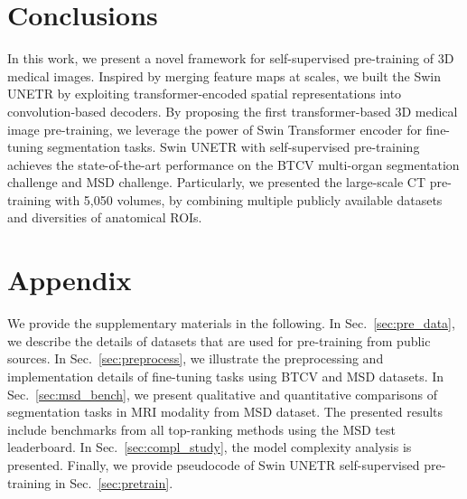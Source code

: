 \documentclass[10pt,twocolumn,letterpaper]{article}
\begin{document}
\section{Conclusions}
In this work, we present a novel framework for self-supervised pre-training of 3D medical images. Inspired by merging feature maps at scales, we built the Swin UNETR by exploiting transformer-encoded spatial representations into convolution-based decoders. By proposing the first transformer-based 3D medical image pre-training, we leverage the power of Swin Transformer encoder for fine-tuning segmentation tasks. Swin UNETR with self-supervised pre-training achieves the state-of-the-art performance on the BTCV multi-organ segmentation challenge and MSD challenge. Particularly, we presented the large-scale CT pre-training with 5,050 volumes, by combining multiple publicly available datasets and diversities of anatomical ROIs. 


{\small


}
\newpage
\section*{Appendix}
\appendix
\renewcommand{\thesection}{\Alph{section}}
\renewcommand\thefigure{S.\arabic{figure}}
\setcounter{figure}{0}
\renewcommand\thetable{S.\arabic{table}}
\setcounter{table}{0}
\renewcommand\thealgorithm{S.\arabic{algorithm}}
\setcounter{algorithm}{0}
We provide the supplementary materials in the following. In Sec.~\ref{sec:pre_data}, we describe the details of datasets that are used for pre-training from public sources. In Sec.~\ref{sec:preprocess}, we illustrate the preprocessing and implementation details of fine-tuning tasks using BTCV and MSD datasets. In Sec.~\ref{sec:msd_bench}, we present qualitative and quantitative comparisons of segmentation tasks in MRI modality from MSD dataset. The presented results include benchmarks from all top-ranking methods using the MSD test leaderboard. In Sec.~\ref{sec:compl_study}, the model complexity analysis is presented. Finally, we provide pseudocode of Swin UNETR self-supervised pre-training in  Sec.~\ref{sec:pretrain}.
\end{document}
